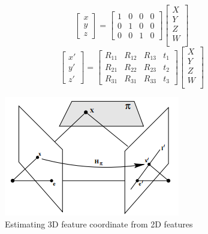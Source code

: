 \documentclass[12pt]{article}
\begin{document}
\begin{equation}\label{eq:xPX_expanded}
    \begin{bmatrix}
        x\\
        y\\
        z
    \end{bmatrix}
    =
    \begin{bmatrix}
        1 & 0 & 0 & 0\\
        0 & 1 & 0 & 0\\
        0 & 0 & 1 & 0
    \end{bmatrix}
    \begin{bmatrix}
        X\\
        Y\\
        Z\\
        W\\
    \end{bmatrix}
\end{equation}
\begin{equation}\label{eq:x'P'X_expanded}
    \begin{bmatrix}
        x'\\
        y'\\
        z'
    \end{bmatrix}
    =
    \begin{bmatrix}
        R_{11} & R_{12} & R_{13} & t_1\\
        R_{21} & R_{22} & R_{23} & t_2\\
        R_{31} & R_{31} & R_{33} & t_3
    \end{bmatrix}
    \begin{bmatrix}
        X\\
        Y\\
        Z\\
        W\\
    \end{bmatrix}
\end{equation}

\begin{figure}\begin{center}
    \includegraphics[scale=0.6]{images/homography.png}
        \caption{Estimating 3D feature coordinate from 2D features ~\cite{Hartley2004}}
        \label{fig:homography}
\end{center}\end{figure}
\end{document}
